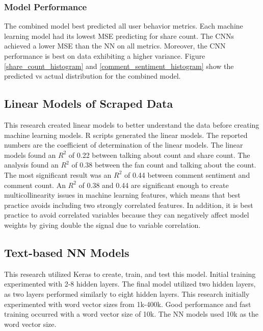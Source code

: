 \documentclass{article}
\begin{document}
\subsubsection{Model Performance}
The combined model best predicted all user behavior metrics. Each machine learning model had its lowest MSE predicting for share count. The CNNs achieved a lower MSE than the NN on all metrics. Moreover, the CNN performance is best on data exhibiting a higher variance. Figure \ref{share_count_histogram} and \ref{comment_sentiment_histogram} show the predicted vs actual distribution for the combined model.

\subsection{Linear Models of Scraped Data}
This research created linear models to better understand the data before creating machine learning models. R scripts generated the linear models. The reported numbers are the coefficient of determination of the linear models. The linear models found an $R^2$ of 0.22 between talking about count and share count. The analysis found an $R^2$ of 0.38 between the fan count and talking about the count. The most significant result was an $R^2$ of 0.44 between comment sentiment and comment count. An $R^2$ of 0.38 and 0.44 are significant enough to create multicollinearity issues in machine learning features, which means that best practice avoids including two strongly correlated features. In addition, it is best practice to avoid correlated variables because they can negatively affect model weights by giving double the signal due to variable correlation. 

\subsection{Text-based NN Models}
This research utilized Keras to create, train, and test this model. Initial training experimented with 2-8 hidden layers. The final model utilized two hidden layers, as two layers performed similarly to eight hidden layers. This research initially experimented with word vector sizes from 1k-400k. Good performance and fast training occurred with a word vector size of 10k. The NN models used 10k as the word vector size.
\end{document}
